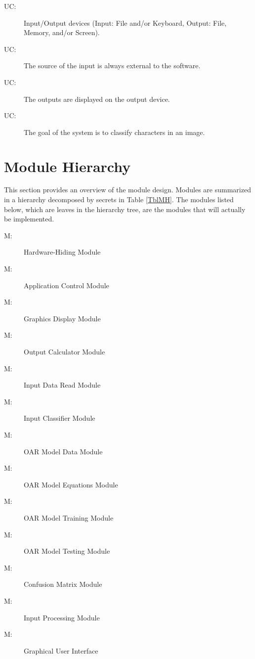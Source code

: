 \documentclass[12pt, titlepage]{article}
\newcounter{ucnum}
\newcommand{\uctheucnum}{UC\theucnum}
\newcounter{mnum}
\newcommand{\mthemnum}{M\themnum}
\begin{document}
\begin{description}
\item[ \uctheucnum \label{ucIO}:] Input/Output devices
  (Input: File and/or Keyboard, Output: File, Memory, and/or Screen).
\item[ \uctheucnum \label{ucInput}:] The source of the input is always external to the software.
\item[ \uctheucnum \label{ucOutput}:] The outputs are displayed on the output device.
\item[ \uctheucnum \label{ucGoal}:] The goal of the system is to classify characters in an image.

\end{description}

\section{Module Hierarchy} \label{SecMH}

This section provides an overview of the module design. Modules are summarized
in a hierarchy decomposed by secrets in Table \ref{TblMH}. The modules listed
below, which are leaves in the hierarchy tree, are the modules that will
actually be implemented.

\begin{description}
\item [ \mthemnum \label{mHH}:] Hardware-Hiding Module
\item [ \mthemnum \label{mAC}:] Application Control Module
\item [ \mthemnum \label{mGD}:] Graphics Display Module
\item [ \mthemnum \label{mOU}:] Output Calculator Module
\item [ \mthemnum \label{mIDR}:] Input Data Read Module
\item [ \mthemnum \label{mIC}:] Input Classifier Module
\item [ \mthemnum \label{mOMD}:] OAR Model Data Module
\item [ \mthemnum \label{mOME}:] OAR Model Equations Module
\item [ \mthemnum \label{mOMTr}:] OAR Model Training Module
\item [ \mthemnum \label{mOMTs}:] OAR Model Testing Module
\item [ \mthemnum \label{mCMX}:] Confusion Matrix Module
\item [ \mthemnum \label{mIP}:] Input Processing Module
\item [ \mthemnum \label{mGUI}:] Graphical User Interface
\end{description}
\end{document}
